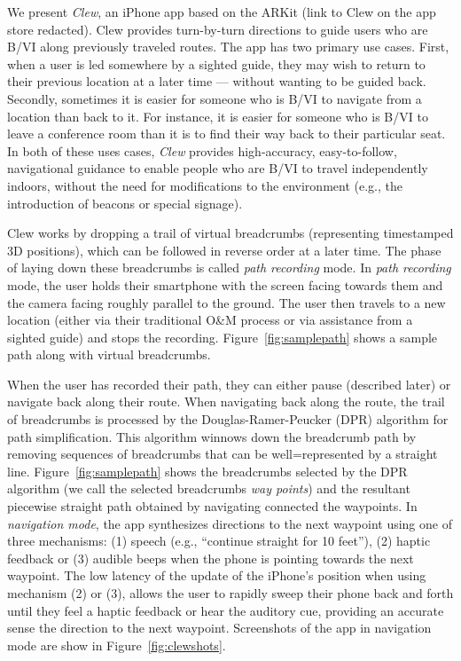 \documentclass[chi_draft]{sigchi}
\newcommand{\BVI}{B/VI\xspace}
\newcommand{\OM}{O\&M\xspace}
\begin{document}
We present \emph{Clew}, an iPhone app based on the ARKit (link to Clew on the app store redacted).  Clew provides turn-by-turn directions to guide users who are \BVI along previously traveled routes.  The app has two primary use cases.  First, when a user is led somewhere by a sighted guide, they may wish to return to their previous location at a later time --- without wanting to be guided back.  Secondly, sometimes it is easier for someone who is \BVI to navigate from a location than back to it.  For instance, it is easier for someone who is \BVI to leave a conference room than it is to find their way back to their particular seat.  In both of these uses cases, \emph{Clew} provides high-accuracy, easy-to-follow, navigational guidance to enable people who are \BVI to travel independently indoors, without the need for modifications to the environment (e.g., the introduction of beacons or special signage).  

Clew works by dropping a trail of virtual breadcrumbs (representing timestamped 3D positions), which can be followed in reverse order at a later time.  The phase of laying down these breadcrumbs is called \emph{path recording} mode.  In \emph{path recording} mode, the user holds their smartphone with the screen facing towards them and the camera facing roughly parallel to the ground.  The user then travels to a new location (either via their traditional \OM process or via assistance from a sighted guide) and stops the recording.  Figure~\ref{fig:samplepath} shows a sample path along with virtual breadcrumbs.%

When the user has recorded their path, they can either pause (described later) or navigate back along their route.  When navigating back along the route, the trail of breadcrumbs is processed by the Douglas-Ramer-Peucker (DPR) algorithm \cite{douglas1973algorithms} for path simplification.  This algorithm winnows down the breadcrumb path by removing sequences of breadcrumbs that can be well=represented by a straight line.  Figure~\ref{fig:samplepath} shows the breadcrumbs selected by the DPR algorithm (we call the selected breadcrumbs \emph{way points}) and the resultant piecewise straight path obtained by navigating connected the waypoints.  In \emph{navigation mode}, the app synthesizes directions to the next waypoint using one of three mechanisms: (1) speech (e.g., ``continue straight for 10 feet''), (2) haptic feedback or (3) audible beeps when the phone is pointing towards the next waypoint.  The low latency of the update of the iPhone's position when using mechanism (2) or (3), allows the user to rapidly sweep their phone back and forth until they feel a haptic feedback or hear the auditory cue, providing an accurate sense the direction to the next waypoint.  Screenshots of the app in navigation mode are show in Figure~\ref{fig:clewshots}.
\end{document}
